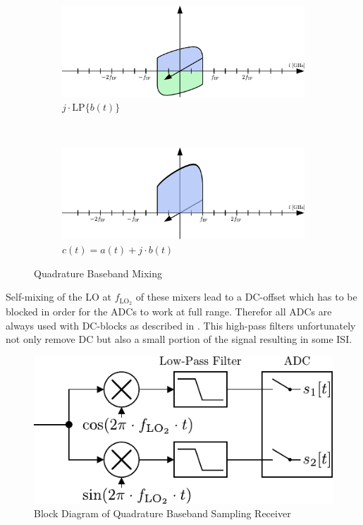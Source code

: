 \begin{figure}[ht]
  \vspace{4ex} \\
  \begin{subfigure}{0.45\textwidth}
    \centering
    \includegraphics[width=\textwidth]{figures/rx_adc_1_freq_jb}
    \caption{$j \cdot \text{LP}\{b(t)\}$}
    \label{fig:rx_adc_1_freq_Hb}
  \end{subfigure}
  ~
  \begin{subfigure}{0.45\textwidth}
    \centering
    \includegraphics[width=\textwidth]{figures/rx_adc_1_freq_c}
    \caption{$c(t) = a(t) + j \cdot b(t)$}
    \label{fig:rx_adc_1_freq_c}
  \end{subfigure}
  \caption{Quadrature Baseband Mixing}
  \label{fig:rx_adc_1_freq}
\end{figure}


Self-mixing of the \gls{LO} at $f_{\text{LO}_2}$ of these mixers lead
to a \gls{DC}-offset which has to be blocked in order for the
\glspl{ADC} to work at full range.
Therefor all \glspl{ADC} are always used with \gls{DC}-blocks as described in
. This high-pass filters unfortunately
not only remove \gls{DC} but also a small portion of the signal
resulting in some \gls{ISI}. \\

\begin{figure}[ht]
  \centering
  \includegraphics[width=\textwidth]{figures/rx_adc_1_bd}
  \caption{Block Diagram of Quadrature Baseband Sampling Receiver}
  \label{fig:rx_adc_1_bd}
\end{figure}

